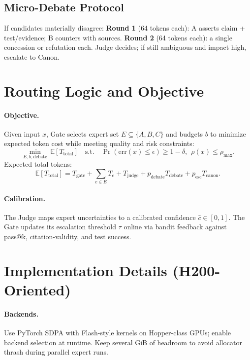 \documentclass[11pt]{article}
\begin{document}
\subsection{Micro-Debate Protocol}
If candidates materially disagree: \textbf{Round 1} (64 tokens each): A asserts claim + test/evidence; B counters with sources. \textbf{Round 2} (64 tokens each): a single concession or refutation each. Judge decides; if still ambiguous and impact high, escalate to Canon.

\section{Routing Logic and Objective}
\paragraph{Objective.} Given input $x$, Gate selects expert set $E \subseteq \{A,B,C\}$ and budgets $b$ to minimize expected token cost while meeting quality and risk constraints:
\begin{equation}
\min_{E,b,\text{debate}} \ \mathbb{E}[T_{\text{total}}] \quad \text{s.t.}\quad \Pr(\text{err}(x) \le \epsilon) \ge 1-\delta,\ \ \rho(x) \le \rho_{\max}.
\end{equation}
Expected total tokens:
\begin{equation}
\mathbb{E}[T_{\text{total}}] = T_{\text{gate}} + \sum_{e \in E} T_{e} + T_{\text{judge}} + p_{\text{debate}} T_{\text{debate}} + p_{\text{esc}} T_{\text{canon}}.
\end{equation}

\paragraph{Calibration.} The Judge maps expert uncertainties to a calibrated confidence $\hat{c}\in[0,1]$. The Gate updates its escalation threshold $\tau$ online via bandit feedback against pass@k, citation-validity, and test success.

\section{Implementation Details (H200-Oriented)}
\paragraph{Backends.} Use PyTorch SDPA with Flash-style kernels on Hopper-class GPUs; enable backend selection at runtime. Keep several GiB of headroom to avoid allocator thrash during parallel expert runs.
\end{document}
